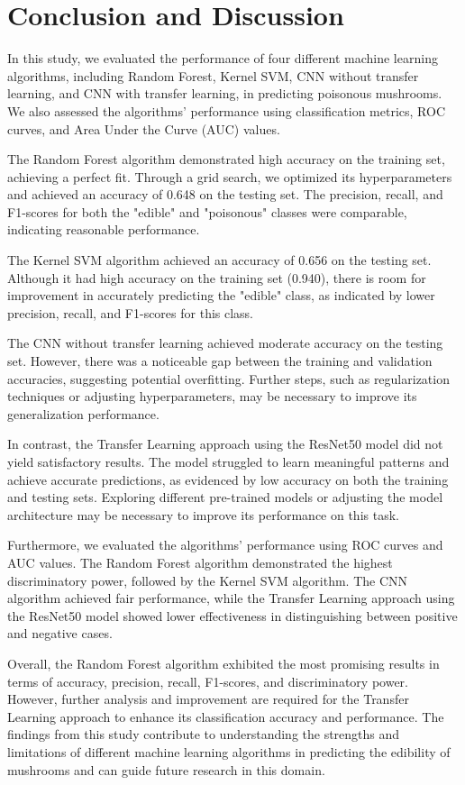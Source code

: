 \documentclass{article}
\begin{document}
\section{Conclusion and Discussion}
In this study, we evaluated the performance of four different machine learning algorithms, including Random Forest, Kernel SVM, CNN without transfer learning, and CNN with transfer learning, in predicting poisonous mushrooms. We also assessed the algorithms' performance using classification metrics, ROC curves, and Area Under the Curve (AUC) values.

The Random Forest algorithm demonstrated high accuracy on the training set, achieving a perfect fit. Through a grid search, we optimized its hyperparameters and achieved an accuracy of 0.648 on the testing set. The precision, recall, and F1-scores for both the "edible" and "poisonous" classes were comparable, indicating reasonable performance.

The Kernel SVM algorithm achieved an accuracy of 0.656 on the testing set. Although it had high accuracy on the training set (0.940), there is room for improvement in accurately predicting the "edible" class, as indicated by lower precision, recall, and F1-scores for this class.

The CNN without transfer learning achieved moderate accuracy on the testing set. However, there was a noticeable gap between the training and validation accuracies, suggesting potential overfitting. Further steps, such as regularization techniques or adjusting hyperparameters, may be necessary to improve its generalization performance.

In contrast, the Transfer Learning approach using the ResNet50 model did not yield satisfactory results. The model struggled to learn meaningful patterns and achieve accurate predictions, as evidenced by low accuracy on both the training and testing sets. Exploring different pre-trained models or adjusting the model architecture may be necessary to improve its performance on this task.

Furthermore, we evaluated the algorithms' performance using ROC curves and AUC values. The Random Forest algorithm demonstrated the highest discriminatory power, followed by the Kernel SVM algorithm. The CNN algorithm achieved fair performance, while the Transfer Learning approach using the ResNet50 model showed lower effectiveness in distinguishing between positive and negative cases.

Overall, the Random Forest algorithm exhibited the most promising results in terms of accuracy, precision, recall, F1-scores, and discriminatory power. However, further analysis and improvement are required for the Transfer Learning approach to enhance its classification accuracy and performance. The findings from this study contribute to understanding the strengths and limitations of different machine learning algorithms in predicting the edibility of mushrooms and can guide future research in this domain.      
\end{document}
